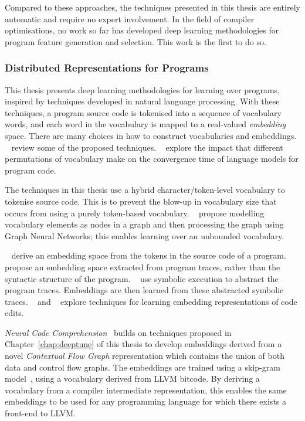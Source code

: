 Compared to these approaches, the techniques presented in this thesis are entirely automatic and require no expert involvement. In the field of compiler optimisations, no work so far has developed deep learning methodologies for program feature generation and selection. This work is the first to do so.


\subsubsection{Distributed Representations for Programs}

This thesis presents deep learning methodologies for learning over programs, inspired by techniques developed in natural language processing. With these techniques, a program source code is tokenised into a sequence of vocabulary words, and each word in the vocabulary is mapped to a real-valued \emph{embedding} space. There are many choices in how to construct vocabularies and embeddings. \citeauthor{Chen2019}~\cite{Chen2019} review some of the proposed techniques. \citeauthor{Babii}~\cite{Babii} explore the impact that different permutations of vocabulary make on the convergence time of language models for program code.

The techniques in this thesis use a hybrid character/token-level vocabulary to tokenise source code. This is to prevent the blow-up in vocabulary size that occurs from using a purely token-based vocabulary. \citeauthor{Cvitkovic2018a}~\cite{Cvitkovic2018a} propose modelling vocabulary elements as nodes in a graph and then processing the graph using Graph Neural Networks; this enables learning over an unbounded vocabulary.

\citeauthor{Mou2016}~\cite{Mou2016} derive an embedding space from the tokens in the source code of a program. \citeauthor{Wang2017d}~\cite{Wang2017d} propose an embedding space extracted from program traces, rather than the syntactic structure of the program. \citeauthor{Henkel2018a}~\cite{Henkel2018a} use symbolic execution to abstract the program traces. Embeddings are then learned from these abstracted symbolic traces. \citeauthor{Yin2018}~\cite{Yin2018} and \citeauthor{Tufano2019}~\cite{Tufano2019} explore techniques for learning embedding representations of code edits.

\emph{Neural Code Comprehension}~\cite{Ben-nun2018} builds on techniques proposed in Chapter~\ref{chap:deeptune} of this thesis to develop embeddings derived from a novel \emph{Contextual Flow Graph} representation which contains the union of both data and control flow graphs. The embeddings are trained using a skip-gram model~\cite{Mikolov2013a}, using a vocabulary derived from LLVM bitcode. By deriving a vocabulary from a compiler intermediate representation, this enables the same embeddings to be used for any programming language for which there exists a front-end to LLVM.



